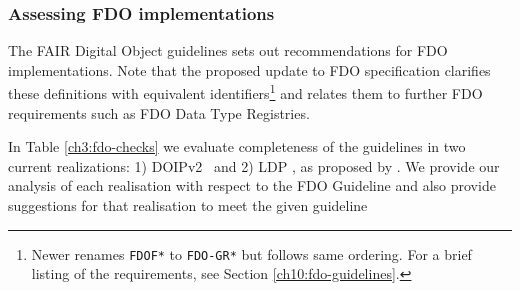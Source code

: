 \subsubsection{Assessing FDO implementations}\label{ch3:doip-fdo-compare}

The FAIR Digital Object guidelines \cite{Bonino 2019} sets out recommendations for FDO implementations. Note that the proposed update to FDO specification \cite{Anders 2023} clarifies these definitions with equivalent identifiers\footnote{
  Newer \cite{Anders 2023} renames \texttt{FDOF*} to \texttt{FDO-GR*} but follows same ordering. For a brief listing of the requirements, see Section \vref{ch10:fdo-guidelines}.
} and relates them to further FDO requirements such as FDO Data Type Registries.

In Table \vref{ch3:fdo-checks} we evaluate completeness of the guidelines in two current realizations: 1) \acrshort{DOIP}v2 \cite{DONA 2018}\ and 2) \acrfull{LDP} \cite{Sporny 2014}, as proposed by \cite{Bonino 2020}.
We provide our analysis of each realisation with respect to the FDO Guideline and also provide suggestions for that realisation to meet the given guideline

